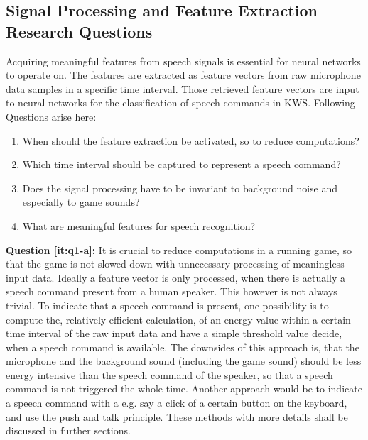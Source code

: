 \subsection{Signal Processing and Feature Extraction Research Questions}\label{sec:intro_rq_signal}
Acquiring meaningful features from speech signals is essential for neural networks to operate on. 
The features are extracted as feature vectors from raw microphone data samples in a specific time interval. 
Those retrieved feature vectors are input to neural networks for the classification of speech commands in KWS. 
Following Questions arise here:
\begin{enumerate}[label={Q.1.\alph*)}, leftmargin=1.75cm]
    \item When should the feature extraction be activated, so to reduce computations?
    \label{it:q1-a}
    \item Which time interval should be captured to represent a speech command?
    \label{it:q1-b}
    \item Does the signal processing have to be invariant to background noise and especially to game sounds?
    \label{it:q1-c}
    \item What are meaningful features for speech recognition?
    \label{it:q1-d}
\end{enumerate}
\noindent
\textbf{Question \ref{it:q1-a}:} 
It is crucial to reduce computations in a running game, so that the game is not slowed down with unnecessary processing of meaningless input data.
Ideally a feature vector is only processed, when there is actually a speech command present from a human speaker. 
This however is not always trivial.
To indicate that a speech command is present, one possibility is to compute the, relatively efficient calculation, of an energy value within a certain time interval of the raw input data and have a simple threshold value decide, when a speech command is available. 
The downsides of this approach is, that the microphone and the background sound (including the game sound) should be less energy intensive than the speech command of the speaker, so that a speech command is not triggered the whole time.
Another approach would be to indicate a speech command with a e.g. say a click of a certain button on the keyboard, and use the push and talk principle. 
These methods with more details shall be discussed in further sections.

